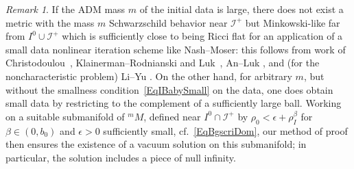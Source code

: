 \documentclass[reqno,11pt,letterpaper]{amsart}
\numberwithin{equation}{section}
\numberwithin{figure}{section}
\theoremstyle{definition}
\theoremstyle{remark}
\newtheorem{rmk}[thm]{Remark}
\newcommand{\ms}{\mathscr}
\newcommand{\scri}{\ms I}
\newcommand{\eps}{\epsilon}
\begin{document}
\begin{rmk}
\label{RmkPfLargeMass}
  If the ADM mass $m$ of the initial data is large, there does not exist a metric with the mass $m$ Schwarzschild behavior near $\scri^+$ but Minkowski-like far from $I^0\cup\scri^+$ which is sufficiently close to being Ricci flat for an application of a small data nonlinear iteration scheme like Nash--Moser: this follows from work of Christodoulou~\cite{ChristodoulouTrapped}, Klainerman--Rodnianski and Luk~\cite{KlainermanRodnianskiTrapped,KlainermanLukRodnianskiTrapped}, An--Luk \cite{AnLukTrapped}, and (for the non\-char\-ac\-ter\-is\-tic problem) Li--Yu \cite{LiYuTrapped}. On the other hand, for arbitrary $m$, but without the smallness condition~\eqref{EqIBabySmall} on the data, one does obtain small data by restricting to the complement of a sufficiently large ball. Working on a suitable submanifold of ${}^m\!M$, defined near $I^0\cap\scri^+$ by $\rho_0<\eps+\rho_I^\beta$ for $\beta\in(0,b_0)$ and $\eps>0$ sufficiently small, cf.\ \eqref{EqBgscriDom}, our method of proof then ensures the existence of a vacuum solution on this submanifold; in particular, the solution includes a piece of null infinity.
\end{rmk}
\end{document}
